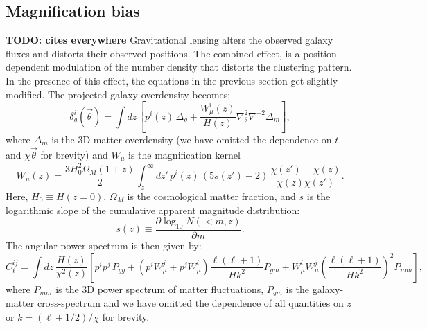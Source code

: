 \documentclass[a4paper,11pt]{article}
\newcommand{\nv}{\vec{\theta}}
\newcommand{\todo}[1]{{\bf TODO: #1}}
\begin{document}
  \subsection{Magnification bias}\label{ssec:theory.mag}
    \todo{cites everywhere}
    Gravitational lensing alters the observed galaxy fluxes and distorts their observed positions. The combined effect, is a position-dependent modulation of the number density that distorts the clustering pattern.
    In the presence of this effect, the equations in the previous section get slightly modified. The projected galaxy overdensity becomes:
    \begin{equation}
      \delta^i_g(\nv)=\int dz\,\left[p^i(z)\,\Delta_g+\frac{W_\mu^i(z)}{H(z)}\nabla_\theta^2\nabla^{-2}\Delta_m\right],
    \end{equation}
    where $\Delta_m$ is the 3D matter overdensity (we have omitted the dependence on $t$ and $\chi\nv$ for brevity) and $W_\mu$ is the magnification kernel
    \begin{equation}
      W_\mu(z)=\frac{3H_0^2\Omega_M(1+z)}{2}\int_z^\infty dz'\,p^i(z)\,\left(5s(z')-2\right)\,\frac{\chi(z')-\chi(z)}{\chi(z)\chi(z')}.
    \end{equation}
    Here, $H_0\equiv H(z=0)$, $\Omega_M$ is the cosmological matter fraction, and $s$ is the logarithmic slope of the cumulative apparent magnitude distribution:
    \begin{equation}
      s(z) \equiv \frac{\partial \log_{10}N(<m, z)}{\partial m}.
      \label{eq:s-func}
    \end{equation}
    The angular power spectrum is then given by:
    \begin{equation}\label{eq:cell_gg_wmag}
      C^{ij}_\ell = \int dz\,\frac{H(z)}{\chi^2(z)}\left[p^ip^j\,P_{gg}+\left(p^iW_\mu^j+p^jW_\mu^i\right)\frac{\ell(\ell+1)}{Hk^2}P_{gm}+W_\mu^iW_\mu^j\left(\frac{\ell(\ell+1)}{Hk^2}\right)^2P_{mm}\right],
    \end{equation}
    where $P_{mm}$ is the 3D power spectrum of matter fluctuations, $P_{gm}$ is the galaxy-matter cross-spectrum and we have omitted the dependence of all quantities on $z$ or $k=(\ell+1/2)/\chi$ for brevity.
\end{document}
